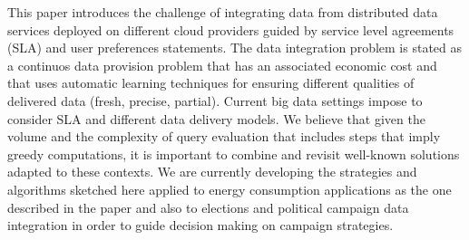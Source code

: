 This paper introduces the challenge of integrating data from distributed data services deployed on different cloud providers guided by service level agreements (SLA) and user preferences statements. The data integration problem is stated as a continuos data provision problem that has an associated economic cost and that uses automatic learning techniques for ensuring different qualities of delivered data (fresh, precise, partial).
Current big data settings impose to consider SLA and different data delivery models. We believe that given the volume and the complexity of query evaluation that includes steps that imply greedy computations, it is important to combine and revisit well-known solutions adapted to these contexts. We are currently developing the strategies and algorithms sketched here applied to energy consumption applications as the one described in the paper and also to elections and political campaign data integration in order to guide decision making on campaign strategies.